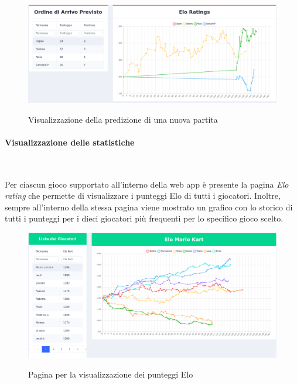 		\begin{figure}[H]
			\centering
			\includegraphics[width=\textwidth]{immagini/predizione.png} \\
			\caption{\label{fig:predizione} Visualizzazione della predizione di una nuova partita}
		\end{figure}
		
		\paragraph{Visualizzazione delle statistiche} ~\smallskip 
		
		\noindent Per ciascun gioco supportato all'interno della web app è presente la pagina \emph{Elo rating}
		che permette di visualizzare i punteggi Elo di tutti i giocatori. Inoltre, sempre all'interno della stessa 
		pagina viene mostrato un grafico con lo storico di tutti i punteggi per i dieci giocatori più frequenti per 
		lo specifico gioco scelto.
		
		\begin{figure}[H]
			\centering
			\includegraphics[width=\textwidth]{immagini/elo.png} \\
			\caption{\label{fig:elo} Pagina per la visualizzazione dei punteggi Elo}
		\end{figure}
		
		
